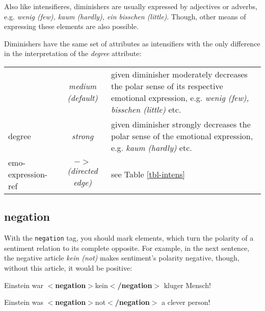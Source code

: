 \documentclass[11pt,a4paper]{article}
\newcommand{\xmltag}[1]{{\textbf{\small$<$#1$>$}}}
\newcommand{\negation}[1]{\xmltag{negation}#1\xmltag{/negation}}
\newlength\clmnwidth
\newenvironment{myexe}{
  \begin{exe}
    \ex\begin{center}
    \itshape
}{
    \end{center}
  \end{exe}
}
\begin{document}
Also like intensifieres, diminishers are usually expressed by adjectives or
adverbs, e.g. \textit{wenig (few), kaum (hardly), ein bisschen (little)}.
Though, other means of expressing these elements are also possible.

Diminishers have the same set of attributes as intensifiers with the only
difference in the interpretation of the \textit{degree} attribute:
\begin{center}
  \begin{tabular}{|l|c|p{\clmnwidth}|}\hline\label{tbl-dimin}

    & \textit{medium (default)} & given diminisher moderately
    decreases the polar sense of its respective emotional expression,
    e.g. \textit{wenig (few), bisschen (little)} etc.\\\cline{2-3}

    \multirow{-2}{*}{degree} & \textit{strong} & given diminisher
    strongly decreases the polar sense of the emotional expression,
    e.g. \textit{kaum (hardly)} etc.\\\hline

    emo-expression-ref & \textit{$->$\newline(directed edge)} &
    see Table \ref{tbl-intens}\\\hline
  \end{tabular}
\end{center}

\subsection{negation}
With the \texttt{negation} tag, you should mark elements, which turn the
polarity of a sentiment relation to its complete opposite.  For example, in
the next sentence, the negative article \textit{kein (not)} makes sentiment's
polarity negative, though, without this article, it would be positive:
\begin{myexe}
Einstein war \negation{kein} kluger Mensch!\label{ex:negation}

Einstein was \negation{not} a clever person!
\end{myexe}
\end{document}
